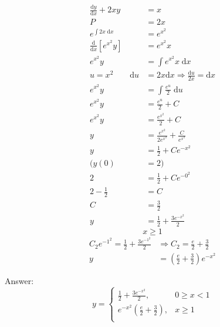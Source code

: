 \documentclass{article}
\begin{document}
\begin{align*}
    \frac{\mathrm{d}y}{\mathrm{d}x}+2xy &= x\\
    P &= 2x\\
    e^{\int 2x \; \mathrm{d}x} &= e^{x^2}\\
    \frac{\mathrm{d}}{\mathrm{d}x}[e^{x^2}y] &= e^{x^2}x\\
    e^{x^2}y &= \int e^{x^2}x \; \mathrm{d}x\\
    u = x^2 \qquad \mathrm{d}u &= 2x\mathrm{d}x \Rightarrow \frac{\mathrm{d}u}{2x} = \mathrm{d}x\\
    e^{x^2}y &= \int\frac{e^{u}}{2} \; \mathrm{d}u\\
    e^{x^2}y &= \frac{e^{u}}{2}+C \\
    e^{x^2}y &= \frac{e^{x^2}}{2}+C \\
    y &= \frac{e^{x^2}}{2e^{x^2}}+\frac{C}{e^{x^2}}\\
    y &= \frac{1}{2}+Ce^{-x^2}\\
    (y(0) &= 2)\\
    2 &= \frac{1}{2}+Ce^{-0^2}\\
    2-\frac{1}{2} &= C\\
    C &= \frac{3}{2}\\
    y &= \frac{1}{2}+\frac{3e^{-x^2}}{2}
\end{align*}
    \[
        x \ge 1
    \]
\begin{align*}
    C_2e^{-1^2}  = \frac{1}{2}+\frac{3e^{-1^2}}{2} &\Rightarrow C_2  = \frac{e}{2}+\frac{3}{2}\\
    y &= \left(\frac{e}{2}+\frac{3}{2}\right)e^{-x^2}
\end{align*}

Answer:
\[
    y= \begin{cases} \frac{1}{2}+\frac{3e^{-x^2}}{2}, & 0 \ge x < 1 \\ e^{-x^2}\left(\frac{e}{2}+\frac{3}{2}\right), & x \ge 1  \\ \end{cases}
\]
    
\end{document}
